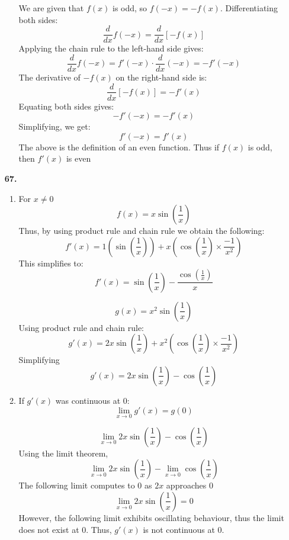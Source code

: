 \documentclass[12pt]{article}
\begin{document}
\begin{enumerate}[start=1,label={\bfseries. },leftmargin=1in]
\begin{enumerate}
    We are given that \( f(x) \) is odd, so \( f(-x) = -f(x) \). Differentiating both sides:
    \[
    \frac{d}{dx} f(-x) = \frac{d}{dx} [-f(x)]
    \]
    Applying the chain rule to the left-hand side gives:
    \[
    \frac{d}{dx} f(-x) = f'(-x) \cdot \frac{d}{dx}(-x) = -f'(-x)
    \]
    The derivative of \( -f(x) \) on the right-hand side is:
    \[
    \frac{d}{dx} [-f(x)] = -f'(x)
    \]
    Equating both sides gives:
    \[
    -f'(-x) = -f'(x)
    \]
    Simplifying, we get:
    \[
    f'(-x) = f'(x)
    \]
    The above is the definition of an even function. Thus if $f(x)$ is odd, then $f'(x)$ is even
    \end{enumerate}
\newpage
    \item [\textbf{67.}] 
    \begin{enumerate}
        \item For $x\neq 0$
        \[
        f(x) = x \sin\left(\frac{1}{x}\right) 
        \]
        Thus, by using product rule and chain rule we obtain the following:
        \[
        f'(x) = 1\left(\sin\left(\frac{1}{x}\right)\right) + x\left(\cos\left(\frac{1}{x}\right) \times \frac{-1}{x^2}\right)
        \]
        This simplifies to:
        \[
        f'(x) =\sin\left(\frac{1}{x}\right) -\frac{\cos\left(\frac{1}{x}\right)}{x}
        \]

        \[
        g(x) = x^2\sin\left(\frac{1}{x}\right)
        \]
        Using product rule and chain rule:
        \[
        g'(x) = 2x\sin\left(\frac{1}{x}\right) + x^2\left(\cos\left(\frac{1}{x}\right) \times \frac{-1}{x^2}\right)
        \]
        Simplifying
        \[
        g'(x) = 2x\sin\left(\frac{1}{x}\right) - \cos\left(\frac{1}{x}\right)
        \]
        \item 
        If $g'(x)$ was continuous at 0:
        \[
        \lim_{x\to0} g'(x) = g(0)
        \]

        \[
        \lim_{x \to 0}2x\sin\left(\frac{1}{x}\right)- \cos\left(\frac{1}{x}\right)
        \]
        Using the limit theorem, 
        \[
        \lim_{x\to0}2x\sin\left(\frac{1}{x}\right) - \lim_{x\to0}\cos\left(\frac{1}{x}\right)
        \]
        The following limit computes to 0 as $2x$ approaches 0
        \[
        \lim_{x\to0}2x\sin\left(\frac{1}{x}\right) = 0
        \]
        However, the following limit exhibits oscillating behaviour, thus the limit does not exist at 0. Thus, $g'(x)$ is not continuous at 0.
        
    \end{enumerate}


\end{enumerate}
\end{document}

